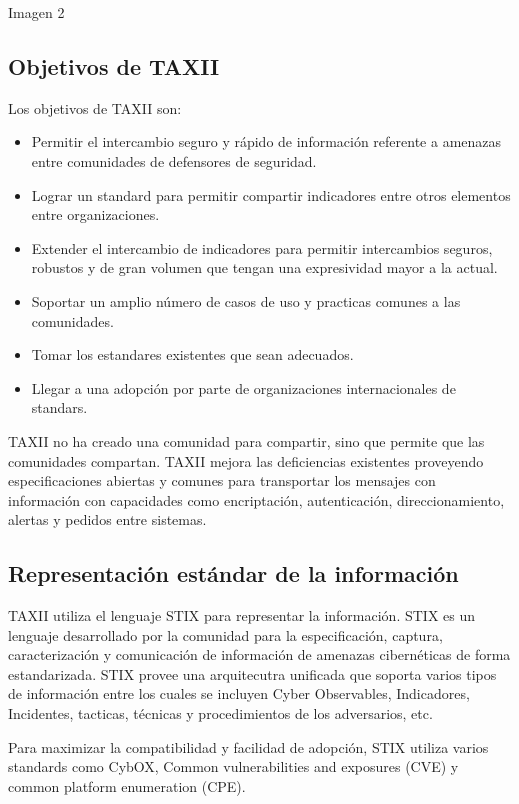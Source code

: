  Imagen 2
 
 \subsection{Objetivos de TAXII}
 Los objetivos de TAXII son:
 \begin{itemize}
   \item Permitir el intercambio seguro y rápido de información referente a 
   amenazas entre comunidades de defensores de seguridad.
   \item Lograr un standard para permitir compartir indicadores entre otros 
   elementos entre organizaciones.
   \item Extender el intercambio de indicadores para permitir intercambios 
   seguros, robustos y de gran volumen que tengan una expresividad mayor a la 
   actual.
   \item Soportar un amplio número de casos de uso y practicas comunes a las 
   comunidades.
   \item Tomar los estandares existentes que sean adecuados.
   \item Llegar a una adopción por parte de organizaciones internacionales de 
   standars.
 \end{itemize}
 
 TAXII no ha creado una comunidad para compartir, sino que permite que las 
 comunidades compartan. TAXII mejora las deficiencias existentes proveyendo 
 especificaciones abiertas y comunes para transportar los mensajes con 
 información con capacidades como encriptación, autenticación, 
 direccionamiento, alertas y pedidos entre sistemas.
  
  \subsection{Representación estándar de la información}
TAXII utiliza el lenguaje STIX para representar la información. STIX es un 
lenguaje desarrollado por la comunidad para la especificación, captura, 
caracterización y comunicación de información de amenazas cibernéticas de forma 
estandarizada. STIX provee una arquitecutra unificada que soporta varios tipos 
de información entre los cuales se incluyen Cyber Observables, Indicadores, 
Incidentes, tacticas, técnicas y procedimientos de los adversarios, etc.

Para maximizar la compatibilidad y facilidad de adopción, STIX utiliza varios 
standards como CybOX, Common vulnerabilities and exposures (CVE) y common 
platform enumeration (CPE).

